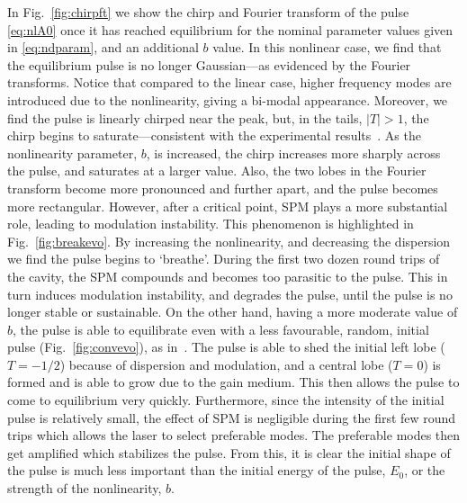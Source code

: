 \documentclass[9pt,twocolumn,twoside]{osajnl}
\begin{document}
In Fig.~\ref{fig:chirpft} we show the chirp and Fourier transform of the pulse \eqref{eq:nlA0} once it has reached equilibrium for the nominal parameter values given in \eqref{eq:ndparam}, and an additional $b$ value. In this nonlinear case, we find that the equilibrium pulse is no longer Gaussian---as evidenced by the Fourier transforms. Notice that compared to the linear case, higher frequency modes are introduced due to the nonlinearity, giving a bi-modal appearance. Moreover, we find the pulse is linearly chirped near the peak, but, in the tails, $|T| > 1$, the chirp begins to saturate---consistent with the experimental results~\cite{chen2008, rothenberg1989b, tomlinson1985}. As the nonlinearity parameter, $b$, is increased, the chirp increases more sharply across the pulse, and saturates at a larger value. Also, the two lobes in the Fourier transform become more pronounced and further apart, and the pulse becomes more rectangular. However, after a critical point, SPM plays a more substantial role, leading to modulation instability. This phenomenon is highlighted in Fig.~\ref{fig:breakevo}. By increasing the nonlinearity, and decreasing the dispersion we find the pulse begins to `breathe'. During the first two dozen round trips of the cavity, the SPM compounds and becomes too parasitic to the pulse. This in turn induces modulation instability, and degrades the pulse, until the pulse is no longer stable or sustainable. On the other hand, having a more moderate value of $b$, the pulse is able to equilibrate even with a less favourable, random, initial pulse (Fig.~\ref{fig:convevo}), as in~\cite{meng2020}. The pulse is able to shed the initial left lobe ($T = -1 / 2$) because of dispersion and modulation, and a central lobe ($T = 0$) is formed and is able to grow due to the gain medium. This then allows the pulse to come to equilibrium very quickly. Furthermore, since the intensity of the initial pulse is relatively small, the effect of SPM is negligible during the first few round trips which allows the laser to select preferable modes. The preferable modes then get amplified which stabilizes the pulse. From this, it is clear the initial shape of the pulse is much less important than the initial energy of the pulse, $E_0$, or the strength of the nonlinearity, $b$.
\end{document}
